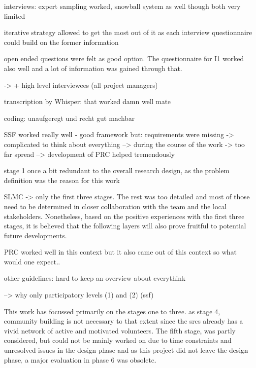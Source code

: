 interviews:
expert sampling worked, snowball system as well though both very limited

iterative strategy allowed to get the most out of it as each interview questionnaire could build on the former information

open ended questions were felt as good option. The questionnaire for I1 worked also well and a lot of information was gained through that.

-> + high level interviewees (all project managers)

transcription by Whisper: that worked damn well mate

coding: unaufgeregt und recht gut machbar

SSF worked really well - good framework
but: requirements were missing -> complicated to think about everything --> during the course of the work -> too far spread --> development of PRC helped tremendously

stage 1 once a bit redundant to the overall research design, as the problem definition was the reason for this work


SLMC -> only the first three stages. The rest was too detailed and most of those need to be determined in closer collaboration with the team and the local stakeholders. Nonetheless, based on the positive experiences with the first three stages, it is believed that the following layers will also prove fruitful to potential future developments.

PRC
worked well in this context but it also came out of this context so what would one expect..

other guidelines:
hard to keep an overview about everythink




















--> why only participatory levels (1) and (2) (ssf)




This work has focussed primarily on the stages one to three. as stage 4, community building is not necessary to that extent since the \acrshort*{srcs} already has a vivid network of active and motivated volunteers. The fifth stage, was partly considered, but could not be mainly worked on due to time constraints and unresolved issues in the design phase and as this project did not leave the design phase, a major evaluation in phase 6 was obsolete. %


